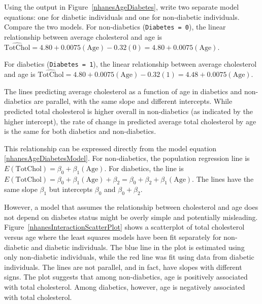 \begin{examplewrap}
\begin{nexample}{Using the output in Figure~\ref{nhanesAgeDiabetes}, write two separate model equations: one for diabetic individuals and one for non-diabetic individuals. Compare the two models.}\label{nhanesNoInteractionModelFit}%
For non-diabetics (\texttt{Diabetes = 0}), the linear relationship between average cholesterol and age is $\widehat{\text{TotChol}} = 4.80 + 0.0075(\text{Age}) - 0.32(0) = 4.80 + 0.0075(\text{Age}).$

For diabetics (\texttt{Diabetes = 1}), the linear relationship between average cholesterol and age is $\widehat{\text{TotChol}} = 4.80 + 0.0075(\text{Age}) - 0.32(1) = 4.48 + 0.0075(\text{Age}).$

The lines predicting average cholesterol as a function of age in diabetics and non-diabetics are parallel, with the same slope and different intercepts. While predicted total cholesterol is higher overall in non-diabetics (as indicated by the higher intercept), the rate of change in predicted average total cholesterol by age is the same for both diabetics and non-diabetics.

This relationship can be expressed directly from the model equation \ref{nhanesAgeDiabetesModel}. For non-diabetics, the population regression line is $E(\text{TotChol}) = \beta_0 + \beta_1(\text{Age})$. For diabetics, the line is $E(\text{TotChol}) = \beta_0 + \beta_1(\text{Age}) + \beta_2 = \beta_0 + \beta_2 + \beta_1(\text{Age})$. The lines have the same slope $\beta_1$ but intercepts $\beta_0$ and $\beta_0 + \beta_2$.
\end{nexample}
\end{examplewrap}

\textD{\newpage}

However, a model that assumes the relationship between cholesterol and age does not depend on diabetes status might be overly simple and potentially misleading. Figure~\ref{nhanesInteractionScatterPlot} shows a scatterplot of total cholesterol versus age where the least squares models have been fit separately for non-diabetic and diabetic individuals. The blue line in the plot is estimated using only non-diabetic individuals, while the red line was fit using data from diabetic individuals. The lines are not parallel, and in fact, have slopes with different signs. The plot suggests that among non-diabetics, age is positively associated with total cholesterol. Among diabetics, however, age is negatively associated with total cholesterol.

